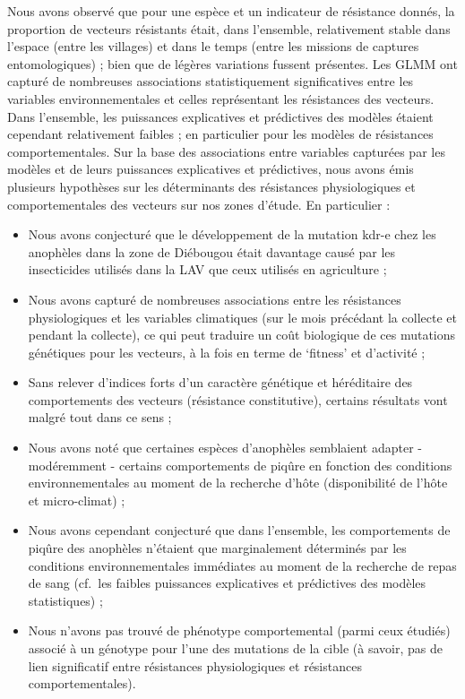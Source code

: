 \documentclass[12pt,twoside]{reedthesis}
\providecommand{\tightlist}{%
  \setlength{\itemsep}{0pt}\setlength{\parskip}{0pt}}
\begin{document}
Nous avons observé que pour une espèce et un indicateur de résistance donnés, la proportion de vecteurs résistants était, dans l'ensemble, relativement stable dans l'espace (entre les villages) et dans le temps (entre les missions de captures entomologiques) ; bien que de légères variations fussent présentes. Les GLMM ont capturé de nombreuses associations statistiquement significatives entre les variables environnementales et celles représentant les résistances des vecteurs. Dans l'ensemble, les puissances explicatives et prédictives des modèles étaient cependant relativement faibles ; en particulier pour les modèles de résistances comportementales. Sur la base des associations entre variables capturées par les modèles et de leurs puissances explicatives et prédictives, nous avons émis plusieurs hypothèses sur les déterminants des résistances physiologiques et comportementales des vecteurs sur nos zones d'étude. En particulier :
\begin{itemize}
\tightlist
\item
  Nous avons conjecturé que le développement de la mutation kdr-e chez les anophèles dans la zone de Diébougou était davantage causé par les insecticides utilisés dans la LAV que ceux utilisés en agriculture ;
\item
  Nous avons capturé de nombreuses associations entre les résistances physiologiques et les variables climatiques (sur le mois précédant la collecte et pendant la collecte), ce qui peut traduire un coût biologique de ces mutations génétiques pour les vecteurs, à la fois en terme de `fitness' et d'activité ;
\item
  Sans relever d'indices forts d'un caractère génétique et héréditaire des comportements des vecteurs (résistance constitutive), certains résultats vont malgré tout dans ce sens ;
\item
  Nous avons noté que certaines espèces d'anophèles semblaient adapter - modéremment - certains comportements de piqûre en fonction des conditions environnementales au moment de la recherche d'hôte (disponibilité de l'hôte et micro-climat) ;
\item
  Nous avons cependant conjecturé que dans l'ensemble, les comportements de piqûre des anophèles n'étaient que marginalement déterminés par les conditions environnementales immédiates au moment de la recherche de repas de sang (cf.~les faibles puissances explicatives et prédictives des modèles statistiques) ;
\item
  Nous n'avons pas trouvé de phénotype comportemental (parmi ceux étudiés) associé à un génotype pour l'une des mutations de la cible (à savoir, pas de lien significatif entre résistances physiologiques et résistances comportementales).\\
\end{itemize}
\end{document}
